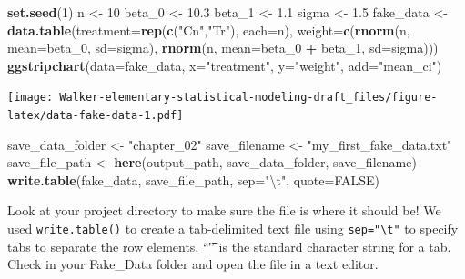 \documentclass[]{book}
\newenvironment{Shaded}{\begin{snugshade}}{\end{snugshade}}
\newcommand{\KeywordTok}[1]{\textcolor[rgb]{0.13,0.29,0.53}{\textbf{#1}}}
\newcommand{\DataTypeTok}[1]{\textcolor[rgb]{0.13,0.29,0.53}{#1}}
\newcommand{\DecValTok}[1]{\textcolor[rgb]{0.00,0.00,0.81}{#1}}
\newcommand{\FloatTok}[1]{\textcolor[rgb]{0.00,0.00,0.81}{#1}}
\newcommand{\CharTok}[1]{\textcolor[rgb]{0.31,0.60,0.02}{#1}}
\newcommand{\StringTok}[1]{\textcolor[rgb]{0.31,0.60,0.02}{#1}}
\newcommand{\OtherTok}[1]{\textcolor[rgb]{0.56,0.35,0.01}{#1}}
\newcommand{\OperatorTok}[1]{\textcolor[rgb]{0.81,0.36,0.00}{\textbf{#1}}}
\newcommand{\NormalTok}[1]{#1}
\begin{document}
\begin{Shaded}
\begin{Highlighting}[]
\KeywordTok{set.seed}\NormalTok{(}\DecValTok{1}\NormalTok{)}
\NormalTok{n <-}\StringTok{ }\DecValTok{10}
\NormalTok{beta_}\DecValTok{0}\NormalTok{ <-}\StringTok{ }\FloatTok{10.3}
\NormalTok{beta_}\DecValTok{1}\NormalTok{ <-}\StringTok{ }\FloatTok{1.1}
\NormalTok{sigma <-}\StringTok{ }\FloatTok{1.5}
\NormalTok{fake_data <-}\StringTok{ }\KeywordTok{data.table}\NormalTok{(}\DataTypeTok{treatment=}\KeywordTok{rep}\NormalTok{(}\KeywordTok{c}\NormalTok{(}\StringTok{"Cn"}\NormalTok{,}\StringTok{"Tr"}\NormalTok{), }\DataTypeTok{each=}\NormalTok{n),}
                        \DataTypeTok{weight=}\KeywordTok{c}\NormalTok{(}\KeywordTok{rnorm}\NormalTok{(n, }\DataTypeTok{mean=}\NormalTok{beta_}\DecValTok{0}\NormalTok{, }\DataTypeTok{sd=}\NormalTok{sigma), }
                                 \KeywordTok{rnorm}\NormalTok{(n, }\DataTypeTok{mean=}\NormalTok{beta_}\DecValTok{0} \OperatorTok{+}\StringTok{ }\NormalTok{beta_}\DecValTok{1}\NormalTok{, }\DataTypeTok{sd=}\NormalTok{sigma)))}
\KeywordTok{ggstripchart}\NormalTok{(}\DataTypeTok{data=}\NormalTok{fake_data, }\DataTypeTok{x=}\StringTok{"treatment"}\NormalTok{, }\DataTypeTok{y=}\StringTok{"weight"}\NormalTok{, }\DataTypeTok{add=}\StringTok{"mean_ci"}\NormalTok{)}
\end{Highlighting}
\end{Shaded}

\texttt{[image: Walker-elementary-statistical-modeling-draft\_files/figure-latex/data-fake-data-1.pdf]}

\begin{Shaded}
\begin{Highlighting}[]
\NormalTok{save_data_folder <-}\StringTok{ "chapter_02"}
\NormalTok{save_filename <-}\StringTok{ "my_first_fake_data.txt"}
\NormalTok{save_file_path <-}\StringTok{ }\KeywordTok{here}\NormalTok{(output_path, save_data_folder, save_filename)}
\KeywordTok{write.table}\NormalTok{(fake_data, save_file_path, }\DataTypeTok{sep=}\StringTok{"}\CharTok{\textbackslash{}t}\StringTok{"}\NormalTok{, }\DataTypeTok{quote=}\OtherTok{FALSE}\NormalTok{)}
\end{Highlighting}
\end{Shaded}

Look at your project directory to make sure the file is where it should
be! We used \texttt{write.table()} to create a tab-delimited text file
using \texttt{sep="\textbackslash{}t"} to specify tabs to separate the
row elements. ``\t'' is the standard character string for a tab. Check
in your Fake\_Data folder and open the file in a text editor.
\end{document}
